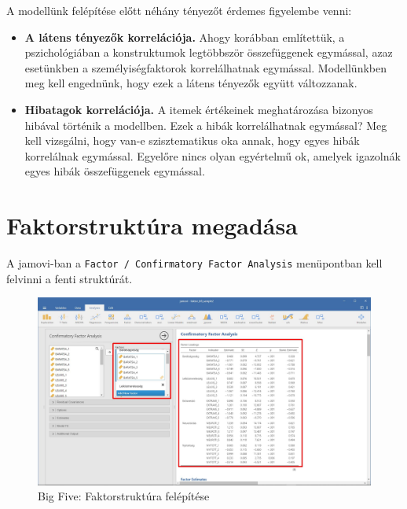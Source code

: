 \documentclass[
  letterpaper,
]{krantz}
\begin{document}
A modellünk felépítése előtt néhány tényezőt érdemes figyelembe venni:

\begin{itemize}
\item
  \textbf{A látens tényezők korrelációja.} Ahogy korábban említettük, a
  pszichológiában a konstruktumok legtöbbször összefüggenek egymással,
  azaz esetünkben a személyiségfaktorok korrelálhatnak egymással.
  Modellünkben meg kell engednünk, hogy ezek a látens tényezők együtt
  változzanak.
\item
  \textbf{Hibatagok korrelációja.} A itemek értékeinek meghatározása
  bizonyos hibával történik a modellben. Ezek a hibák korrelálhatnak
  egymással? Meg kell vizsgálni, hogy van-e szisztematikus oka annak,
  hogy egyes hibák korrelálnak egymással. Egyelőre nincs olyan
  egyértelmű ok, amelyek igazolnák egyes hibák összefüggenek egymással.
\end{itemize}

\hypertarget{faktorstruktuxfara-megaduxe1sa}{%
\section{Faktorstruktúra
megadása}\label{faktorstruktuxfara-megaduxe1sa}}

A jamovi-ban a \texttt{Factor\ /\ Confirmatory\ Factor\ Analysis}
menüpontban kell felvinni a fenti struktúrát.

\begin{figure}

{\centering \includegraphics{./images/cfa_kep_01.jpg}

}

\caption{Big Five: Faktorstruktúra felépítése}

\end{figure}
\end{document}
